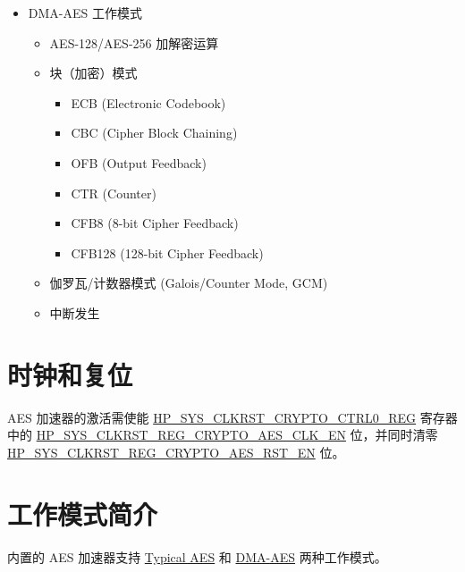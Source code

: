 \documentclass[main\_\_CN.tex]{subfiles}
\begin{document}
    \begin{itemize}
    \item DMA-AES 工作模式
        \begin{itemize}
            \item AES-128/AES-256 加解密运算
            \item 块（加密）模式
                \begin{itemize}
                    \item ECB (Electronic Codebook)
                    \item CBC (Cipher Block Chaining)
                    \item OFB (Output Feedback)
                    \item CTR (Counter)
                    \item CFB8 (8-bit Cipher Feedback)
                    \item CFB128 (128-bit Cipher Feedback)
                \end{itemize}
            \item 伽罗瓦/计数器模式 (Galois/Counter Mode, GCM)
            \item 中断发生
        \end{itemize}
    \end{itemize}

\section{时钟和复位}

AES 加速器的激活需使能 \hyperref[regdesc:HPSYSCLKRSTCRYPTOCTRL0REG]{HP\_SYS\_CLKRST\_CRYPTO\_CTRL0\_REG} 寄存器中的 \hyperref[fielddesc:HPSYSCLKRSTREGCRYPTOAESCLKEN]{HP\_SYS\_CLKRST\_REG\_CRYPTO\_AES\_CLK\_EN} 位，并同时清零 \hyperref[fielddesc:HPSYSCLKRSTREGCRYPTOAESRSTEN]{HP\_SYS\_CLKRST\_REG\_CRYPTO\_AES\_RST\_EN} 位。



\section{工作模式简介}

\chipname{} 内置的 AES 加速器支持 \hyperref[sec:aes-typical-modes]{Typical AES} 和 \hyperref[sec:aes-dma-aes]{DMA-AES} 两种工作模式。
\end{document}
